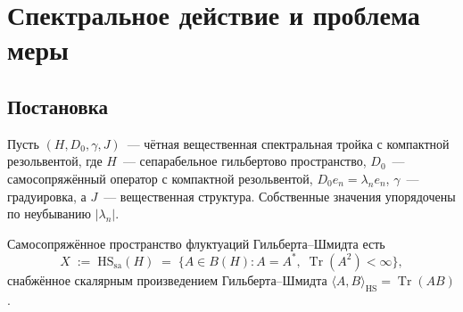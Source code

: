 \documentclass[12pt,a4paper]{article}
\theoremstyle{plain}
\theoremstyle{definition}
\theoremstyle{remark}
\newcommand{\Tr}{\operatorname{Tr}}
\newcommand{\HS}{\mathrm{HS}}
\newcommand{\sa}{\mathrm{sa}}
\begin{document}
\section{Спектральное действие и проблема меры}
\label{sec:measure-problem}

\subsection{Постановка}

Пусть $(H, D_0, \gamma, J)$~--- чётная вещественная спектральная
тройка с компактной резольвентой, где $H$~--- сепарабельное
гильбертово пространство, $D_0$~--- самосопряжённый оператор с
компактной резольвентой, $D_0 e_n = \lambda_n e_n$, $\gamma$~---
градуировка, а $J$~--- вещественная структура.  Собственные значения
упорядочены по неубыванию $|{\lambda_n}|$.

Самосопряжённое пространство флуктуаций Гильберта--Шмидта есть
\begin{equation}\label{eq:HS-space}
  X \;:=\; \HS_\sa(H) \;=\;
  \bigl\{A \in B(H) : A = A^*,\;\Tr(A^2) < \infty\bigr\},
\end{equation}
снабжённое скалярным произведением Гильберта--Шмидта
$\langle A, B\rangle_{\HS} = \Tr(AB)$.
\end{document}
